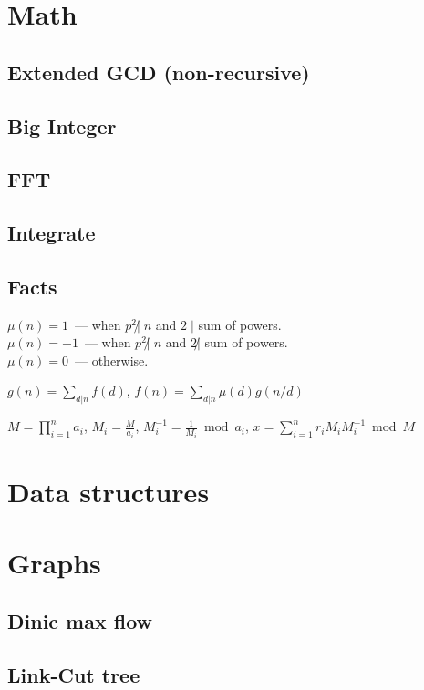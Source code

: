 \documentclass[11pt]{article}
\begin{document}
\pagestyle{fancy}
\newpage

\section{Math}
\subsection{Extended GCD (non-recursive)}

\subsection{Big Integer}

\subsection{FFT}

\subsection{Integrate}

\subsection{Facts}
$\mu(n) = 1$~--- when $p^2 \not| \;n$ and $2 \;|$ sum of powers.\\
$\mu(n) = -1$~--- when $p^2 \not| \;n$ and $2 \not|$ sum of powers.\\
$\mu(n) = 0$~--- otherwise.

$g(n) = \sum_{d | n}f(d)$, $f(n) = \sum_{d | n}\mu(d)g(n/d)$

$M={\displaystyle \prod _{{i=1}}^{n}a_{i}}$,
$M_{i}={\frac  M{a_{i}}}$,
$M_{i}^{{-1}}={\frac  1{M_{i}}}{\bmod  {a_{i}}}$,
$x=\sum_{i=1}^{n}r_{i}M_{i}M_{i}^{-1}\bmod M$

\section{Data structures}

\section{Graphs}
\subsection{Dinic max flow}

\subsection{Link-Cut tree}

\end{document}

